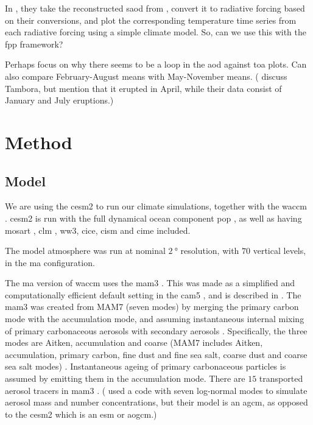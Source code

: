 \documentclass[twocol]{ametsocV5}
\begin{document}
In \citet{marshall2020}, they take the reconstructed \acrshort{saod} from
\citet{toohey2017}, convert it to radiative forcing based on their conversions, and plot
the corresponding temperature time series from each radiative forcing using a simple
climate model. So, can we use this with the \acrfull{fpp} framework?

Perhaps focus on why there seems to be a loop in the \acrshort{aod} against
\acrshort{toa} plots. Can also compare February-August means with May-November means.
(\citet{marshall2021} discuss Tambora, but mention that it erupted in April, while their
data consist of January and July eruptions.)


\section{Method}

\subsection{Model}

We are using the \acrfull{cesm2} \citep{danabasoglu2020} to run our climate simulations,
together with the \acrfull{waccm} \citep{gettleman2019}. \acrshort{cesm2} is run with
the full dynamical ocean component \acrfull{pop} \citep{smith2010, danabasoglu2020}, as
well as having \acrfull{mosart} \citep{li2013, danabasoglu2020}, \acrfull{clm}
\citep{lawrence2019, danabasoglu2020}, \acrfull{ww3}, \acrfull{cice}, \acrfull{cism} and
\acrfull{cime} included.

The model atmosphere was run at nominal \(\SI{2}{\degree}\) resolution, with \(70\)
vertical levels, in the \acrfull{ma} configuration.

The \acrshort{ma} version of \acrshort{waccm} uses the \acrfull{mam3}
\citep{gettleman2019}. This was made as a simplified and computationally efficient
default setting in the \acrshort{cam5} \citep{liu2016}, and is described in
\citet{liu2012}. The \acrshort{mam3} was created from MAM7 (seven modes) by merging the
primary carbon mode with the accumulation mode, and assuming instantaneous internal
mixing of primary carbonaceous aerosols with secondary aerosols \citep{liu2016}.
Specifically, the three modes are Aitken, accumulation and coarse (MAM7 includes Aitken,
accumulation, primary carbon, fine dust and fine sea salt, coarse dust and coarse sea
salt modes) \citep{liu2016}. Instantaneous ageing of primary carbonaceous particles is
assumed by emitting them in the accumulation mode. There are \( 15 \) transported
aerosol tracers in \acrshort{mam3} \citep{liu2016}. (\citet{marshall2019, marshall2020,
  marshall2021} used a code with seven log-normal modes to simulate aerosol mass and
number concentrations, but their model is an \acrfull{agcm}, as opposed to the
\acrshort{cesm2} which is an \acrfull{esm} or \acrfull{aogcm}.)
\end{document}
